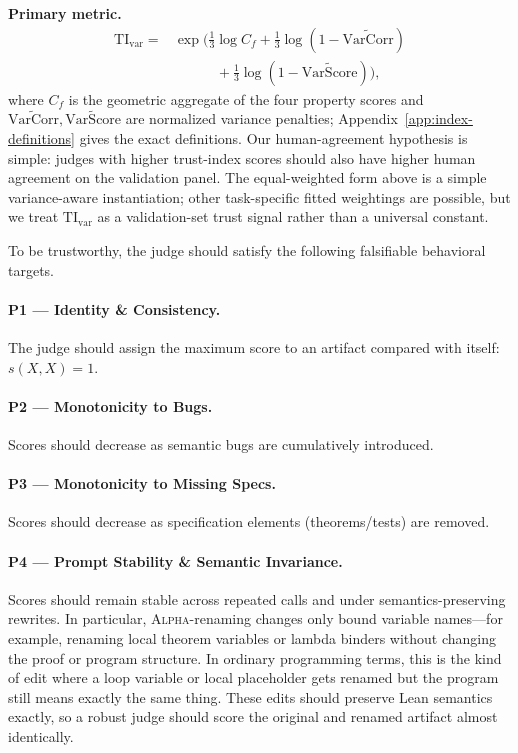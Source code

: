 \documentclass{article}
\begin{document}
\textbf{Primary metric.}
\[
  \begin{aligned}
    \mathrm{TI}_{\mathrm{var}}
    ={} & \exp\!\Big(
    \tfrac{1}{3}\log C_f
    + \tfrac{1}{3}\log(1-\widetilde{\mathrm{VarCorr}}) \\
        & \qquad\quad
    + \tfrac{1}{3}\log(1-\widetilde{\mathrm{VarScore}})
    \Big),
  \end{aligned}
\]
where \(C_f\) is the geometric aggregate of the four property scores and \(\widetilde{\mathrm{VarCorr}},\widetilde{\mathrm{VarScore}}\) are normalized variance penalties; Appendix~\ref{app:index-definitions} gives the exact definitions. Our human-agreement hypothesis is simple: judges with higher trust-index scores should also have higher human agreement on the validation panel. The equal-weighted form above is a simple variance-aware instantiation; other task-specific fitted weightings are possible, but we treat \(\mathrm{TI}_{\mathrm{var}}\) as a validation-set trust signal rather than a universal constant.

To be trustworthy, the judge should satisfy the following falsifiable behavioral targets.

\paragraph{P1 — Identity \& Consistency.}
The judge should assign the maximum score to an artifact compared with itself: \(s(X,X)=1\).

\paragraph{P2 — Monotonicity to Bugs.}
Scores should decrease as semantic bugs are cumulatively introduced.

\paragraph{P3 — Monotonicity to Missing Specs.}
Scores should decrease as specification elements (theorems/tests) are removed.

\paragraph{P4 — Prompt Stability \& Semantic Invariance.}
Scores should remain stable across repeated calls and under semantics-preserving rewrites.
In particular, \textsc{Alpha}-renaming changes only bound variable names---for example, renaming local theorem variables or lambda binders without changing the proof or program structure. In ordinary programming terms, this is the kind of edit where a loop variable or local placeholder gets renamed but the program still means exactly the same thing. These edits should preserve Lean semantics exactly, so a robust judge should score the original and renamed artifact almost identically.
\end{document}
